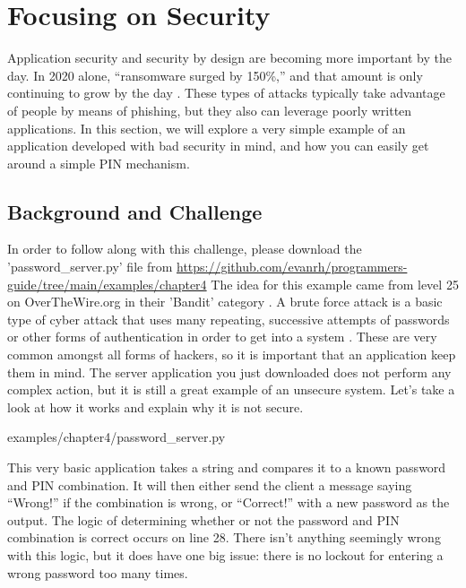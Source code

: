 \documentclass[12pt, oneside, a4paper]{book}
\begin{document}
      \section{Focusing on Security}
      Application security and security by design are becoming more important by the day.
      In 2020 alone, ``ransomware surged by 150\%,'' and that amount is only continuing to grow by the day \autocite{muncasterRansomwareAttacksSoared2021}.
      These types of attacks typically take advantage of people by means of phishing, but they also can leverage poorly written applications.
      In this section, we will explore a very simple example of an application developed with bad security in mind, and how you can easily get around a simple PIN mechanism.

      \subsection{Background and Challenge}
      In order to follow along with this challenge, please download the 'password\_server.py' file from \url{https://github.com/evanrh/programmers-guide/tree/main/examples/chapter4}
      The idea for this example came from level 25 on OverTheWire.org in their 'Bandit' category \autocite{overthewireOverTheWireLevelGoal}.
      A brute force attack is a basic type of cyber attack that uses many repeating, successive attempts of passwords or other forms of authentication in order to get into a system \autocite{universityGrowingCybersecurityThreats2019}.
      These are very common amongst all forms of hackers, so it is important that an application keep them in mind.
      The server application you just downloaded does not perform any complex action, but it is still a great example of an unsecure system.
      Let's take a look at how it works and explain why it is not secure.

      
      {examples/chapter4/password_server.py}

      This very basic application takes a string and compares it to a known password and PIN combination.
      It will then either send the client a message saying ``Wrong!'' if the combination is wrong, or ``Correct!'' with a new password as the output.
      The logic of determining whether or not the password and PIN combination is correct occurs on line 28.
      There isn't anything seemingly wrong with this logic, but it does have one big issue: there is no lockout for entering a wrong password too many times.
\end{document}
